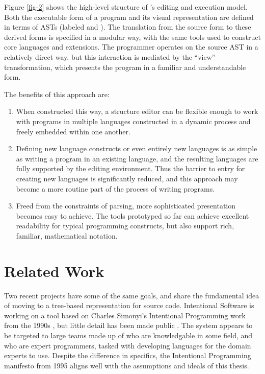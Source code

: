 Figure \ref{fig-2} shows the high-level structure of \Meta's editing and execution model. Both the executable form of a program and its visual representation are defined in terms of ASTs (labeled  and ). The translation from the source form to these derived forms is specified in a modular way, with the same tools used to construct core languages and extensions. The programmer operates on the source AST in a relatively direct way, but this interaction is mediated by the ``view'' transformation, which presents the program in a familiar and understandable form.

The benefits of this approach are:

\begin{enumerate}

\item When constructed this way, a structure editor can be flexible enough to work with programs in multiple languages constructed in a dynamic process and freely embedded within one another.

\item Defining new language constructs or even entirely new languages is as simple as writing a program in an existing language, and the resulting languages are fully supported by the editing environment. Thus the barrier to entry for creating new languages is significantly reduced, and this approach may become a more routine part of the process of writing programs.

\item Freed from the constraints of parsing, more sophisticated presentation becomes easy to achieve. The tools prototyped so far can achieve excellent readability for typical programming constructs, but also support rich, familiar, mathematical notation.

\end{enumerate}

%
%
\section{Related Work}

Two recent projects have some of the same goals, and share the fundamental idea of moving to a tree-based representation for source code. Intentional Software is working on a tool based on Charles Simonyi's Intentional Programming work from the 1990s \cite{simonyi}, but little detail has been made public \cite{intentional}. The system appears to be targeted to large teams made up of  who are knowledgable in some field, and  who are expert programmers, tasked with developing languages for the domain experts to use. Despite the difference in specifics, the Intentional Programming manifesto from 1995 aligns well with the assumptions and ideals of this thesis.


